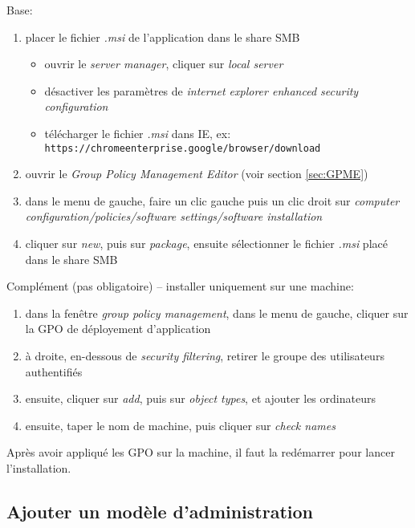 \documentclass[a4paper]{article}
\begin{document}
Base:
\begin{enumerate}
    \item placer le fichier \textit{.msi} de l'application dans le share SMB
    \begin{example}
        \begin{itemize}
            \item ouvrir le \textit{server manager}, cliquer sur \textit{local server}
            \item désactiver les paramètres de \textit{internet explorer enhanced security configuration}
            \item télécharger le fichier \textit{.msi} dans IE, ex: \texttt{https://chromeenterprise.google/browser/download}
        \end{itemize}
    \end{example}
    \item ouvrir le \textit{Group Policy Management Editor} (voir section \ref{sec:GPME})
    \item dans le menu de gauche, faire un clic gauche puis un clic droit sur \textit{computer configuration/policies/software settings/software installation}
    \item cliquer sur \textit{new}, puis sur \textit{package}, ensuite sélectionner le fichier \textit{.msi} placé dans le share SMB
\end{enumerate}
Complément (pas obligatoire) -- installer uniquement sur une machine:
\begin{enumerate}
    \item dans la fenêtre \textit{group policy management}, dans le menu de gauche, cliquer sur la GPO de déployement d'application
    \item à droite, en-dessous de \textit{security filtering}, retirer le groupe des utilisateurs authentifiés
    \item ensuite, cliquer sur \textit{add}, puis sur \textit{object types}, et ajouter les ordinateurs
    \item ensuite, taper le nom de machine, puis cliquer sur \textit{check names}
\end{enumerate}
Après avoir appliqué les GPO sur la machine, il faut la redémarrer pour lancer l'installation.





\subsection{Ajouter un modèle d'administration}
\end{document}
